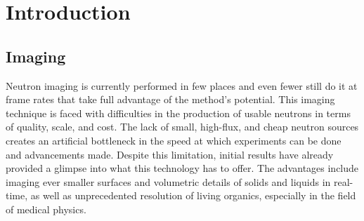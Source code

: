 \setcounter{page}{1}
\section{Introduction}
\label{sec:introduction}

\subsection{Imaging}

Neutron imaging is currently performed in few places and even fewer still do it at frame rates that take full advantage of the method's potential. This imaging technique is faced with difficulties in the production of usable neutrons in terms of quality, scale, and cost. The lack of small, high-flux, and cheap neutron sources creates an artificial bottleneck in the speed at which experiments can be done and advancements made. Despite this limitation, initial results have already provided a glimpse into what this technology has to offer. The advantages include imaging ever smaller surfaces and volumetric details of solids and liquids in real-time, as well as unprecedented resolution of living organics, especially in the field of medical physics.

